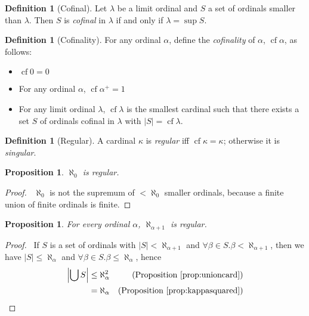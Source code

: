 \documentclass{book}
\let\qed\relax
\newtheorem{prop}[ax]{Proposition}
\theoremstyle{definition}
\newtheorem{df}[ax]{Definition}
\newcommand{\cf}{\ensuremath{\operatorname{cf}}}
\begin{document}
\begin{df}[Cofinal]
Let $\lambda$ be a limit ordinal and $S$ a set of ordinals smaller than $\lambda$. Then $S$ is \emph{cofinal} in $\lambda$ if and only if $\lambda = \sup S$.
\end{df}

\begin{df}[Cofinality]
For any ordinal $\alpha$, define the \emph{cofinality} of $\alpha$, $\cf \alpha$, as follows:
\begin{itemize}
\item $\cf 0 = 0$
\item For any ordinal $\alpha$, $\cf \alpha^+ = 1$
\item For any limit ordinal $\lambda$, $\cf \lambda$ is the smallest cardinal such that there exists a set $S$ of ordinals cofinal in $\lambda$ with $|S| = \cf \lambda$.
\end{itemize}
\end{df}

\begin{df}[Regular]
A cardinal $\kappa$ is \emph{regular} iff $\cf \kappa = \kappa$; otherwise it is \emph{singular}.
\end{df}

\begin{prop}
$\aleph_0$ is regular.
\end{prop}

\begin{proof}
\pf\ $\aleph_0$ is not the supremum of $< \aleph_0$ smaller ordinals, because a finite union of finite ordinals is finite. \qed
\end{proof}

\begin{prop}
For every ordinal $\alpha$, $\aleph_{\alpha + 1}$ is regular.
\end{prop}

\begin{proof}
\pf\ If $S$ is a set of ordinals with $|S| < \aleph_{\alpha + 1}$ and $\forall \beta \in S. \beta < \aleph_{\alpha + 1}$, then we have $|S| \leq \aleph_\alpha$ and $\forall \beta \in S. \beta \leq \aleph_\alpha$, hence
\begin{align*}
\left|\bigcup S\right| & \leq \aleph_{\alpha}^2 & (\text{Proposition \ref{prop:unioncard}}) \\
& = \aleph_{\alpha} & (\text{Proposition \ref{prop:kappasquared}}) \qed
\end{align*}
\end{proof}
\end{document}
